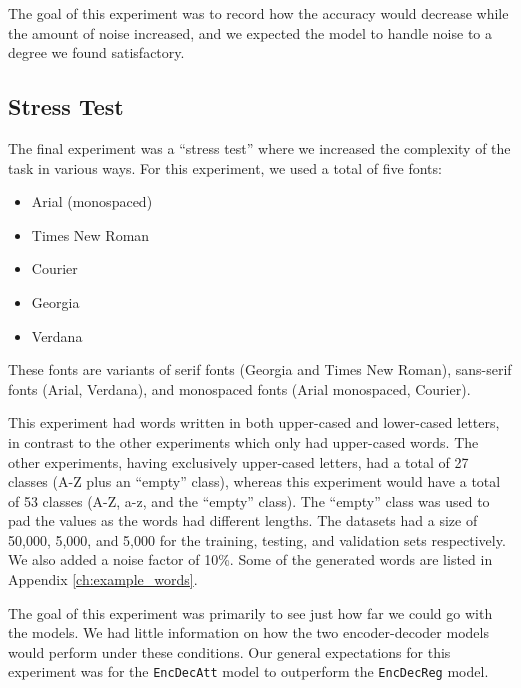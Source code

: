 The goal of this experiment was to record how the accuracy would decrease while the amount of noise increased, and we expected the model to handle noise to a degree we found satisfactory.

\subsection{Stress Test}
The final experiment was a ``stress test'' where we increased the complexity of the task in various ways. For this experiment, we used a total of five fonts:

\begin{itemize}
    \item Arial (monospaced)
    \item Times New Roman
    \item Courier
    \item Georgia
    \item Verdana
\end{itemize}

These fonts are variants of serif fonts (Georgia and Times New Roman), sans-serif fonts (Arial, Verdana), and monospaced fonts (Arial monospaced, Courier).

This experiment had words written in both upper-cased and lower-cased letters, in contrast to the other experiments which only had upper-cased words. The other experiments, having exclusively upper-cased letters, had a total of 27 classes (A-Z plus an ``empty'' class), whereas this experiment would have a total of 53 classes (A-Z, a-z, and the ``empty'' class). The ``empty'' class was used to pad the values as the words had different lengths. The datasets had a size of 50,000, 5,000, and 5,000 for the training, testing, and validation sets respectively. We also added a noise factor of 10\%. Some of the generated words are listed in Appendix \ref{ch:example_words}.

The goal of this experiment was primarily to see just how far we could go with the models. We had little information on how the two encoder-decoder models would perform under these conditions. Our general expectations for this experiment was for the {\tt EncDecAtt} model to outperform the {\tt EncDecReg} model.